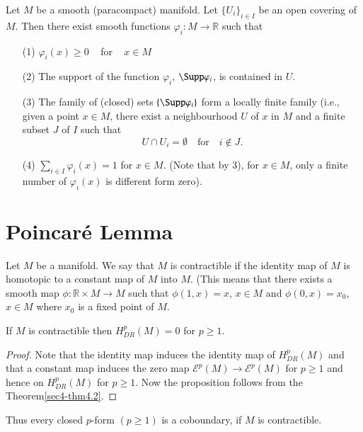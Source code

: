 Let $M$ be a smooth (paracompact) manifold. Let $\{U_{i}\}_{i\in I}$ be an open covering of $M$. Then there exist smooth functions $\varphi_{i}:M\to \mathbb{R}$ such that
\begin{itemize}
\item[(1)] $\varphi_{i}(x)\geq 0$ ~ for ~ $x\in M$

\item[(2)] The support of the function $\varphi_{i}$, $\Supp \varphi_{i}$, is contained in $U$.

\item[(3)] The family of (closed) sets $\{\Supp \varphi_{i}\}$ form a locally finite family (i.e., given a point $x\in M$, there exist a neighbourhood $U$ of $x$ in $M$ and a finite subset $J$ of $I$ such that 
$$
U\cap U_{i}=\emptyset\text{~~ for~~ } i\not\in J.
$$

\item[(4)] $\sum\limits_{i\in I}\varphi_{i}(x)=1$ for $x\in M$. (Note that by 3), for $x\in M$, only a finite number of $\varphi_{i}(x)$ is different form zero).
\end{itemize}

\section{Poincar\'e Lemma}\label{sec13-app-sec2}

Let $M$ be a manifold. We say that $M$ is contractible if the identity map of $M$ is homotopic to a constant map of $M$ into $M$. (This means that there exists a smooth map $\phi:\mathbb{R}\times M\to M$ such that $\phi(1,x)=x$, $x\in M$ and $\phi(0,x)=x_{0}$, $x\in M$ where $x_{0}$ is a fixed point of $M$.

\begin{prop*}
If $M$ is contractible then $H^{p}_{DR}(M)=0$ for $p\geq 1$.
\end{prop*}

\begin{proof}
Note that the identity map induces the identity map of $H^{p}_{DR}(M)$ and that a constant map induces the zero map $\mathscr{E}^{p}(M)\to \mathscr{E}^{p}(M)$ for $p\geq 1$ and hence on $H^{p}_{DR}(M)$ for $p\geq 1$. Now the proposition follows from the Theorem\pageoriginale \ref{sec4-thm4.2}.
\end{proof}

\begin{remark*}
Thus every closed $p$-form $(p\geq 1)$ is a coboundary, if $M$ is contractible.
\end{remark*}

